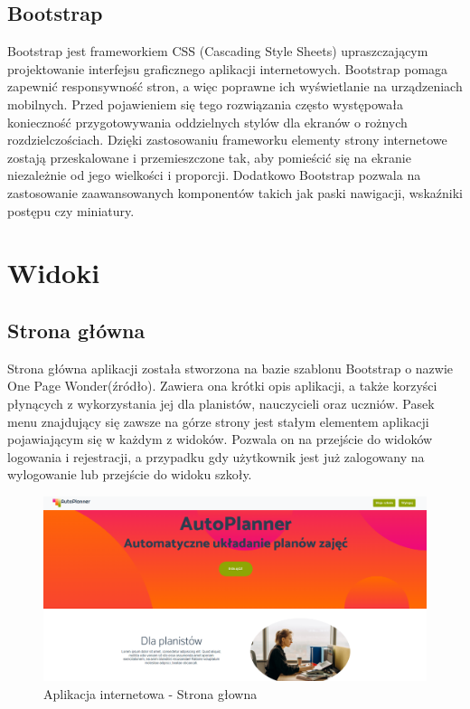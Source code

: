 \subsection{Bootstrap}
Bootstrap jest frameworkiem CSS (Cascading Style Sheets) upraszczającym projektowanie interfejsu graficznego aplikacji internetowych. Bootstrap pomaga zapewnić responsywność stron, a więc poprawne ich wyświetlanie na urządzeniach mobilnych. Przed pojawieniem się tego rozwiązania często występowała konieczność przygotowywania oddzielnych stylów dla ekranów o rożnych rozdzielczościach. Dzięki zastosowaniu frameworku elementy strony internetowe zostają przeskalowane i przemieszczone tak, aby pomieścić się na ekranie niezależnie od jego wielkości i proporcji. Dodatkowo Bootstrap pozwala na zastosowanie zaawansowanych komponentów takich jak paski nawigacji, wskaźniki postępu czy miniatury. 

\clearpage
\section{Widoki}
\subsection{Strona główna}
Strona główna aplikacji została stworzona na bazie szablonu Bootstrap o nazwie One Page Wonder(źródło). Zawiera ona krótki opis aplikacji, a także korzyści płynących z wykorzystania jej dla planistów, nauczycieli oraz uczniów. Pasek menu znajdujący się zawsze na górze strony jest stałym elementem aplikacji pojawiającym się w każdym z widoków. Pozwala on na przejście do widoków logowania i rejestracji, a przypadku gdy użytkownik jest już zalogowany na wylogowanie lub przejście do widoku szkoły. 
\begin{figure}[!ht]
\centering\includegraphics[width=\textwidth]{figures/main}
\caption{Aplikacja internetowa - Strona głowna}\label{rys:main}
\end{figure}
